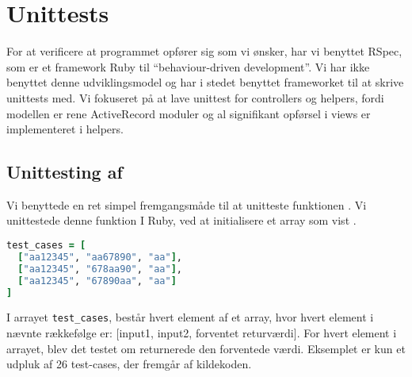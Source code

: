 \section{Unittests}
\label{sec:unittests}
For at verificere at programmet opfører sig som vi ønsker, har vi benyttet RSpec, som er et framework Ruby til ``behaviour-driven development''. Vi har ikke benyttet denne udviklingsmodel og har i stedet benyttet frameworket til at skrive unittests med.
Vi fokuseret på at lave unittest for controllers og helpers, fordi modellen er rene ActiveRecord moduler og al signifikant opførsel i views er implementeret i helpers.

\subsection{Unittesting af }
Vi benyttede en ret simpel fremgangsmåde til at unitteste funktionen . Vi unittestede denne funktion I Ruby, ved at initialisere et array som vist .

\begin{lstlisting}[caption={Et eksempel på en række testcases til brug ved unittesting.},label=lst:testcases,language=Ruby]
test_cases = [
  ["aa12345", "aa67890", "aa"],
  ["aa12345", "678aa90", "aa"],
  ["aa12345", "67890aa", "aa"]
]
\end{lstlisting}

I arrayet \texttt{test\_cases}, består hvert element af et array, hvor hvert element i nævnte rækkefølge er: [input1, input2, forventet returværdi].
For hvert element i arrayet, blev det testet om  returnerede den forventede værdi. Eksemplet er kun et udpluk af 26 test-cases, der fremgår af kildekoden.
